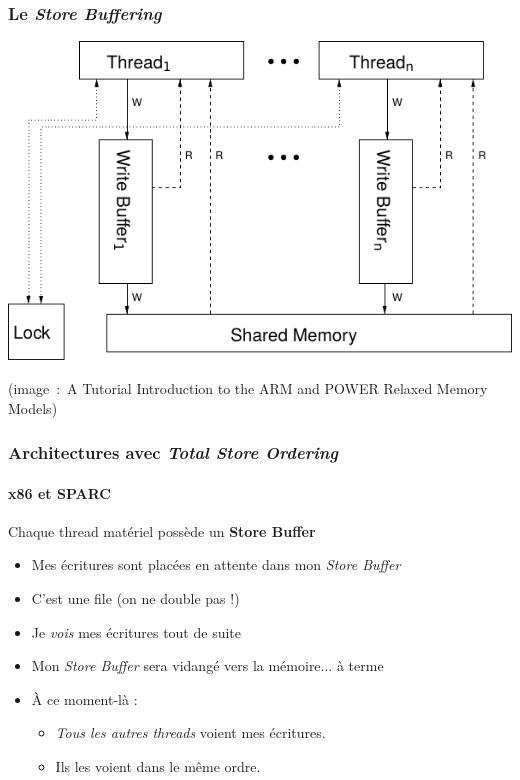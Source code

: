 \documentclass[xcolor={x11names,svgnames}]{beamer}
\begin{document}

\begin{frame}[label=tso]
  \frametitle{Le \emph{Store Buffering}}
  
  \centering
  \includegraphics[width=\textwidth]{tso}

  \medskip
  
  \scriptsize (image~:~A Tutorial
    Introduction to the ARM and POWER Relaxed Memory Models)
\end{frame}


\begin{frame}[label=tso]
  \frametitle{Architectures avec \emph{Total Store Ordering}}
  \framesubtitle{x86 et SPARC}
  
  \begin{block}{Chaque thread \alert{matériel} possède un \textbf{Store Buffer}}
    \begin{itemize}
    \item Mes écritures sont placées en attente dans mon \emph{Store Buffer}
    \item C'est une file (on ne double pas !)
    \item Je \emph{vois} mes écritures tout de suite
    \item Mon \emph{Store Buffer} \alert{sera} \og vidangé\fg{} vers la mémoire... à terme
    \item À ce moment-là :
      \begin{itemize}
      \item  \emph{Tous les autres threads} voient mes écritures.
      \item Ils les voient dans le même ordre.
      \end{itemize}
    \end{itemize}
  \end{block}
\end{frame}
\end{document}
